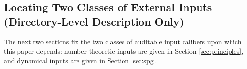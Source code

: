 \subsection{Locating Two Classes of External Inputs (Directory-Level Description Only)}\label{subsec:prelim-input-map}
The next two sections fix the two classes of auditable input calibers upon which this paper depends: number-theoretic inputs are given in Section \ref{sec:principles}, and dynamical inputs are given in Section \ref{sec:spg}.
